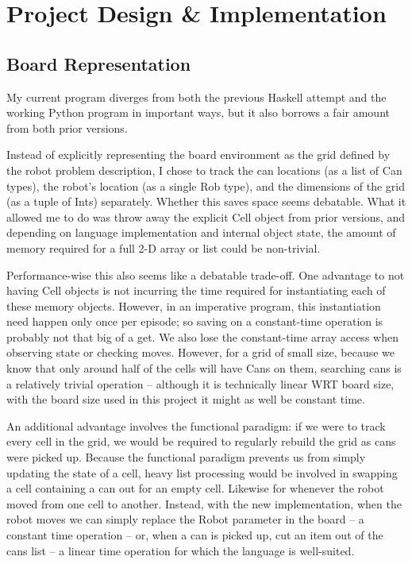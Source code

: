 \documentclass[12pt,a4paper]{article}
\begin{document}
	\section{Project Design \& Implementation}
	
		\subsection{Board Representation}
		
		\par My current program diverges from both the previous Haskell attempt and the working Python program in important ways, but it also borrows a fair amount from both prior versions.
		\par Instead of explicitly representing the board environment as the grid defined by the robot problem description, I chose to track the can locations (as a list of Can types), the robot's location (as a single Rob type), and the dimensions of the grid (as a tuple of Ints) separately. Whether this saves space seems debatable. What it allowed me to do was throw away the explicit Cell object from prior versions, and depending on language implementation and internal object state, the amount of memory required for a full 2-D array or list could be non-trivial. 
		\par Performance-wise this also seems like a debatable trade-off. One advantage to not having Cell objects is not incurring the time required for instantiating each of these memory objects. However, in an imperative program, this instantiation need happen only once per episode; so saving on a constant-time operation is probably not that big of a get. We also lose the constant-time array access when observing state or checking moves. However, for a grid of small size, because we know that only around half of the cells will have Cans on them, searching cans is a relatively trivial operation -- although it is technically linear WRT board size, with the board size used in this project it might as well be constant time. 
		\par An additional advantage involves the functional paradigm: if we were to track every cell in the grid, we would be required to regularly rebuild the grid as cans were picked up. Because the functional paradigm prevents us from simply updating the state of a cell, heavy list processing would be involved in swapping a cell containing a can out for an empty cell. Likewise for whenever the robot moved from one cell to another. Instead, with the new implementation, when the robot moves we can simply replace the Robot parameter in the board -- a constant time operation -- or, when a can is picked up, cut an item out of the cans list -- a linear time operation for which the language is well-suited.
\end{document}
